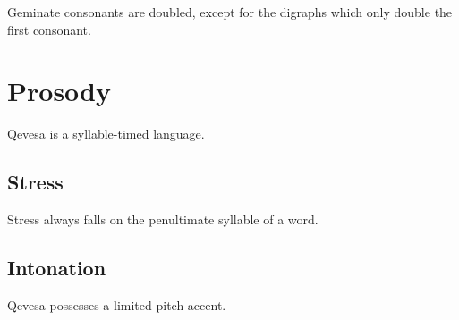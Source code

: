 \documentclass[grammar]{subfiles}
\begin{document}
Geminate consonants are doubled, except for the digraphs which only double the
first consonant.  



\section{Prosody}
\label{sec:prosody}

Qevesa is a syllable-timed language.
\ToBeWritten

\subsection{Stress}
\label{ssec:stress}

Stress always falls on the penultimate syllable of a word. 
\ToBeWritten

\subsection{Intonation}
\label{ssec:intonation}

Qevesa possesses a limited pitch-accent.
\ToBeWritten
\end{document}
